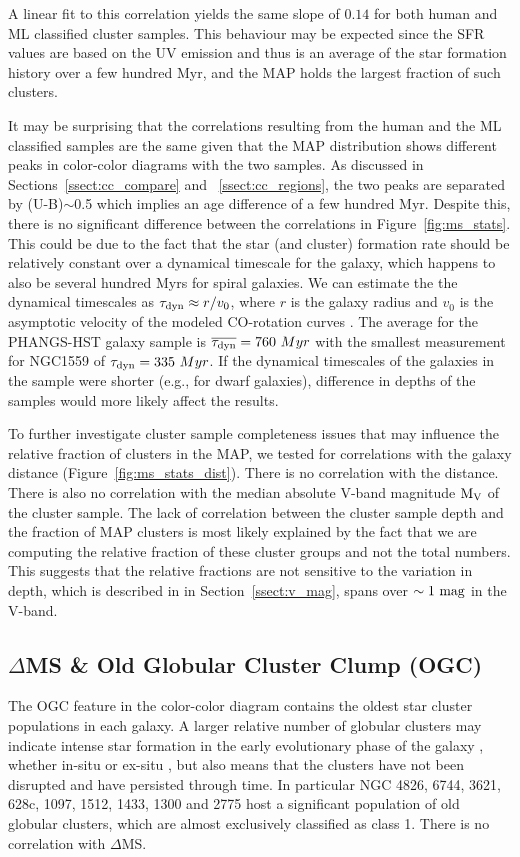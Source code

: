 \documentclass[]{aastex631}
\begin{document}
A linear fit to this correlation yields the same slope of $0.14$ for both human and ML classified cluster samples. This behaviour may be expected since the SFR values are based on the UV emission and thus is an average of the star formation history over a few hundred Myr, and the MAP holds the largest fraction of such clusters. 


It may be surprising that the correlations resulting from the human and the ML classified samples are the same given that the MAP distribution shows different peaks in color-color diagrams with the two samples.  As discussed in Sections~\ref{ssect:cc_compare} and  ~\ref{ssect:cc_regions}, the two peaks are separated by (U-B)$\sim$0.5 which implies an age difference of a few hundred Myr.  Despite this, there is no significant difference between the correlations in Figure~\ref{fig:ms_stats}.  This could be due to the fact that the star (and cluster) formation rate should be relatively constant over a dynamical timescale for the galaxy, which happens to also be several hundred Myrs for spiral galaxies.
We can estimate the the dynamical timescales as $\tau_{\rm dyn} \approx r / v_0$, where $r$ is the galaxy radius and $v_0$ is the asymptotic velocity of the modeled CO-rotation curves \citep{lang_phangs_2020}. The average for the PHANGS-HST galaxy sample is $\overline{\tau_{\rm dyn}} = 760~{Myr}$ with the smallest measurement for NGC1559 of $\tau_{\rm dyn}=335~{Myr}$. 
If the dynamical timescales of the galaxies in the sample were shorter (e.g., for dwarf galaxies), difference in depths of the samples would more likely affect the results.

To further investigate cluster sample completeness issues that may influence the relative fraction of clusters in the MAP, we tested for correlations with the galaxy distance (Figure~\ref{fig:ms_stats_dist}). There is no correlation with the distance. 
There is also no correlation with the median absolute V-band magnitude ${\rm M_V}$ of the cluster sample. 
The lack of correlation between the cluster sample depth and the fraction of MAP clusters is most likely explained by the fact that we are computing the relative fraction of these cluster groups and not the total numbers. 
This suggests that the relative fractions are not sensitive to the variation in depth, which is described in in Section~\ref{ssect:v_mag}, spans over $\sim 1~{\rm mag}$ in the V-band.

\subsection{$\Delta$MS \& Old Globular Cluster Clump (OGC)}
The OGC feature in the color-color diagram contains the oldest star cluster populations in each galaxy. A larger relative number of globular clusters may indicate intense star formation in the early evolutionary phase of the galaxy \citep{BS06}, whether in-situ or ex-situ \citep[and references therein]{CG19}, but also means that the clusters have not been disrupted and have persisted through time. 
In particular NGC 4826, 6744, 3621, 628c, 1097, 1512, 1433, 1300 and 2775 host a significant population of old globular clusters, which are almost exclusively classified as class 1.  There is no correlation with $\Delta$MS.
\end{document}
